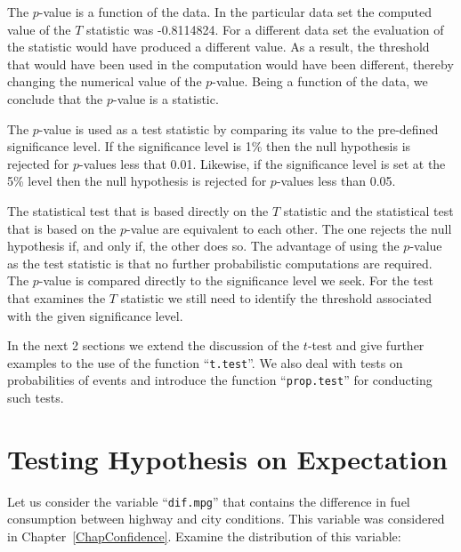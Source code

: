 \documentclass[]{krantz}
\makeatletter
\newenvironment{Shaded}{\begin{snugshade}}{\end{snugshade}}
\newcommand{\KeywordTok}[1]{\textcolor[rgb]{0.13,0.29,0.53}{\textbf{#1}}}
\newcommand{\StringTok}[1]{\textcolor[rgb]{0.31,0.60,0.02}{#1}}
\newcommand{\OperatorTok}[1]{\textcolor[rgb]{0.81,0.36,0.00}{\textbf{#1}}}
\newcommand{\NormalTok}[1]{#1}
\newenvironment{kframe}{%
\medskip{}
\setlength{\fboxsep}{.8em}
 \def\at@end@of@kframe{}%
 \ifinner\ifhmode%
  \def\at@end@of@kframe{\end{minipage}}%
  \begin{minipage}{\columnwidth}%
 \fi\fi%
 \def\FrameCommand##1{\hskip\@totalleftmargin \hskip-\fboxsep
 \colorbox{shadecolor}{##1}\hskip-\fboxsep
     \hskip-\linewidth \hskip-\@totalleftmargin \hskip\columnwidth}%
 \MakeFramed {\advance\hsize-\width
   \@totalleftmargin\z@ \linewidth\hsize
   \@setminipage}}%
 {\par\unskip\endMakeFramed%
 \at@end@of@kframe}
\renewenvironment{Shaded}{\begin{kframe}}{\end{kframe}}
\theoremstyle{definition}
\theoremstyle{definition}
\theoremstyle{definition}
\theoremstyle{remark}
\makeatother
\begin{document}
The \(p\)-value is a function of the data. In the particular data set
the computed value of the \(T\) statistic was -0.8114824. For a
different data set the evaluation of the statistic would have produced a
different value. As a result, the threshold that would have been used in
the computation would have been different, thereby changing the
numerical value of the \(p\)-value. Being a function of the data, we
conclude that the \(p\)-value is a statistic.

The \(p\)-value is used as a test statistic by comparing its value to
the pre-defined significance level. If the significance level is 1\%
then the null hypothesis is rejected for \(p\)-values less that 0.01.
Likewise, if the significance level is set at the 5\% level then the
null hypothesis is rejected for \(p\)-values less than 0.05.

The statistical test that is based directly on the \(T\) statistic and
the statistical test that is based on the \(p\)-value are equivalent to
each other. The one rejects the null hypothesis if, and only if, the
other does so. The advantage of using the \(p\)-value as the test
statistic is that no further probabilistic computations are required.
The \(p\)-value is compared directly to the significance level we seek.
For the test that examines the \(T\) statistic we still need to identify
the threshold associated with the given significance level.

In the next 2 sections we extend the discussion of the \(t\)-test and
give further examples to the use of the function ``\texttt{t.test}''. We
also deal with tests on probabilities of events and introduce the
function ``\texttt{prop.test}'' for conducting such tests.

\section{Testing Hypothesis on
Expectation}\label{testing-hypothesis-on-expectation}

Let us consider the variable ``\texttt{dif.mpg}'' that contains the
difference in fuel consumption between highway and city conditions. This
variable was considered in Chapter~\ref{ChapConfidence}. Examine the
distribution of this variable:

\begin{Shaded}
\end{Shaded}
\end{document}
